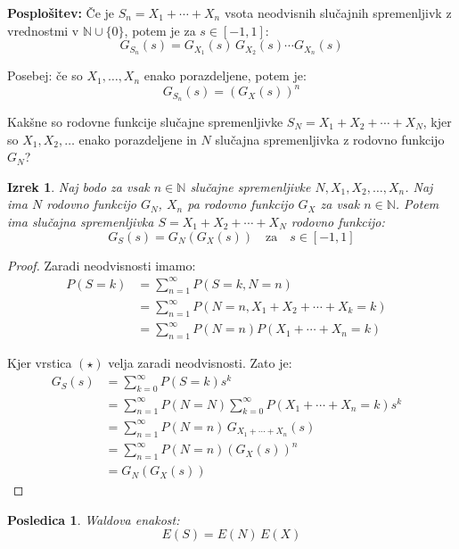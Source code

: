 \documentclass[12pt]{book}
\def\n{\noindent}
\def\s{\vspace{10pt}}
\theoremstyle{definition}
\theoremstyle{plain}
\newtheorem{izrek}{Izrek}
\theoremstyle{plain}
\theoremstyle{plain}
\newtheorem{posledica}{Posledica}
\theoremstyle{remark}
\begin{document}
\n \textbf{Posplošitev:} Če je $S_n=X_1 + \cdots + X_n$ vsota neodvisnih slučajnih spremenljivk z vrednostmi v $\mathbb{N} \cup \{0\}$, potem je za $s \in [-1, 1]$: 
$$
G_{S_n}(s)=G_{X_1}(s)\, G_{X_2}(s) \cdots G_{X_n}(s)
$$

\n Posebej: če so $X_1, \ldots, X_n$ enako porazdeljene, potem je: 
$$
G_{S_n}(s)=\left(G_X(s)\right)^n
$$

\s

Kakšne so rodovne funkcije slučajne spremenljivke $S_N=X_1 + X_2 + \cdots + X_N$, kjer so $X_1, X_2, \ldots$ enako porazdeljene in $N$ slučajna spremenljivka z rodovno funkcijo $G_N$?

\begin{izrek}
    Naj bodo za vsak $n \in \mathbb{N}$ slučajne spremenljivke $N, X_1, X_2, \ldots, X_n$. Naj ima $N$ rodovno funkcijo $G_N$, $X_n$ pa rodovno funkcijo $G_X$ za vsak $n \in \mathbb{N}$. Potem ima slučajna spremenljivka $S=X_1+X_2+\cdots+X_N$ rodovno funkcijo: 
    $$
    G_S(s)=G_N\left(G_X(s)\right) \quad \text{za} \quad s \in [-1,1]
    $$
\end{izrek}

\begin{proof}
    Zaradi neodvisnosti imamo: 
    \begin{align*}
        P(S=k)&=\sum_{n=1}^{\infty} P(S=k, N=n) & \\
        &=\sum_{n=1}^{\infty} P\left(N=n, X_1+X_2+ \cdots +X_k=k\right) & \\
        &=\sum_{n=1}^{\infty} P(N=n) P\left(X_1+\cdots+X_n=k\right) & \tag{$\star$}
    \end{align*}
    
    Kjer vrstica $(\star)$ velja zaradi neodvisnosti. Zato je: 
    \begin{align*}
        G_S(s)&=\sum_{k=0}^{\infty} P(S=k) s^k & \\
        &=\sum_{n=1}^{\infty} P(N=N) \sum_{k=0}^{\infty} P\left(X_1+\cdots+X_n=k\right)  s^k & \\
        &=\sum_{n=1}^{\infty} P(N=n) \, G_{X_1+\cdots+X_n}\left(s\right) & \\
        &=\sum_{n=1}^{\infty} P(N=n) \left(G_X(s)\right)^n & \\
        &=G_N\left(G_X(s)\right)
    \end{align*}
\end{proof}

\begin{posledica}
    Waldova enakost: 
    $$
    E(S)=E(N) \, E(X)
    $$
\end{posledica}
\end{document}

